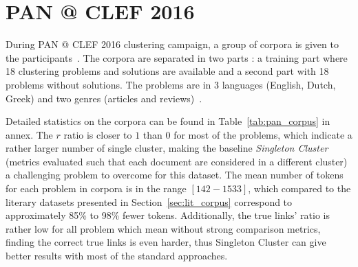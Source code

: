 \section{PAN @ CLEF 2016}

During PAN @ CLEF 2016 clustering campaign, a group of corpora is given to the participants~\cite{pan16_corpus}.
The corpora are separated in two parts : a training part where 18 clustering problems and solutions are available and a second part with 18 problems without solutions.
The problems are in 3 languages (English, Dutch, Greek) and two genres (articles and reviews)~\cite{pan16}.

Detailed statistics on the corpora can be found in Table~\ref{tab:pan_corpus} in annex.
The $r$ ratio is closer to $1$ than $0$ for most of the problems, which indicate a rather larger number of single cluster, making the baseline \textit{Singleton Cluster} (metrics evaluated such that each document are considered in a different cluster) a challenging problem to overcome for this dataset.
The mean number of tokens for each problem in corpora is in the range $[142-1533]$, which compared to the literary datasets presented in Section~\ref{sec:lit_corpus} correspond to approximately 85\% to 98\% fewer tokens.
Additionally, the true links' ratio is rather low for all problem which mean without strong comparison metrics, finding the correct true links is even harder, thus Singleton Cluster can give better results with most of the standard approaches.
